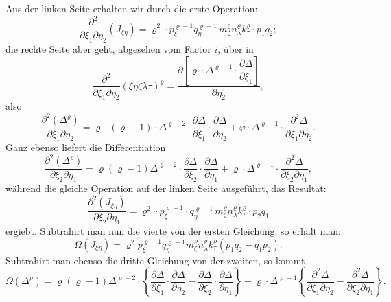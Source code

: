 \documentclass[11pt]{article}
\providecommand{\weq}[2]{\begin{equation}\tag{#1}#2\end{equation}}
\let\Delta\varDelta
\let\Omega\varOmega
\begin{document}
Aus der linken Seite erhalten wir durch die erste Operation:
\weq{1}{\frac{\partial^2}{\partial \xi_1 \partial \eta_2} (J_{\xi\eta}) = \varrho^2 \cdot p_\xi^{\varrho-1} q_\eta^{\varrho-1}\, m_\zeta^\varrho n_\lambda^\varrho k_\tau^\varrho \cdot p_1 q_2;}
die rechte Seite aber geht, abgesehen vom Factor $i$, über in
\[
\frac{\partial^2}{\partial \xi_1 \partial \eta_2} (\xi\eta\zeta\lambda\tau)^\varrho = \frac{\partial\left[\varrho \cdot \Delta^{\varrho-1} \cdot \dfrac{\partial \Delta}{\partial \xi_1}\right]}{\partial \eta_2},
\]
also
\weq{2}{\frac{\partial^2 (\Delta^\varrho)}{\partial \xi_1 \partial \eta_2} = \varrho \cdot (\varrho - 1) \cdot \Delta^{\varrho-2} \cdot \frac{\partial \Delta}{\partial \xi_1} \cdot \frac{\partial \Delta}{\partial \eta_2} + \varphi \cdot \Delta^{\varrho-1} \cdot \frac{\partial^2 \Delta}{\partial \xi_1 \partial \eta_2}. %
}
Ganz ebenso liefert die Differentiation
\weq{3}{\frac{\partial^2 (\Delta^\varrho)}{\partial \xi_2 \partial \eta_1} = \varrho (\varrho - 1) \Delta^{\varrho-2} \cdot \frac{\partial \Delta}{\partial \xi_2} \cdot \frac{\partial \Delta}{\partial \eta_1} + \varrho \cdot \Delta^{\varrho-1} \cdot \frac{\partial^2 \Delta}{\partial \xi_2 \partial \eta_1},}
während die gleiche Operation auf der linken Seite ausgeführt, das Resultat:
\weq{4}{\frac{\partial^2 (J_{\xi\eta})}{\partial \xi_2 \partial \eta_1} = \varrho^2 \cdot p_\xi^{\varrho-1} \cdot q_\eta^{\varrho-1}\, m_\zeta^\varrho n_\lambda^\varrho k_\tau^\varrho \cdot p_2 q_1}
ergiebt. Subtrahirt man nun die vierte von der ersten Gleichung, so erhält man:
\weq{5}{\Omega(J_{\xi\eta}) = \varrho^2 p_\xi^{\varrho-1} q_\eta^{\varrho-1} m_\zeta^\varrho n_\lambda^\varrho k_\tau^\varrho (p_1 q_2 - q_1 p_2).}
Subtrahirt man ebenso die dritte Gleichung von der zweiten, so kommt
\weq{6}{\Omega(\Delta^\varrho) = \varrho (\varrho - 1) \Delta^{\varrho-2} \cdot \left\{\frac{\partial \Delta}{\partial \xi_1} \cdot \frac{\partial \Delta}{\partial \eta_2} - \frac{\partial \Delta}{\partial \xi_2} \cdot \frac{\partial \Delta}{\partial \eta_1}\right\} + \varrho \cdot \Delta^{\varrho-1} \left\{\frac{\partial^2 \Delta}{\partial \xi_1 \partial \eta_2} - \frac{\partial^2 \Delta}{\partial \xi_2 \partial \eta_1}\right\}.}
\end{document}
